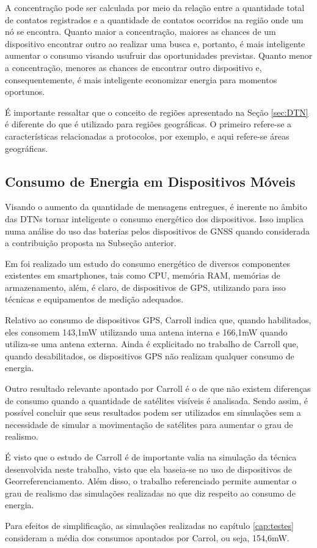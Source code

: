 A concentração pode ser calculada por meio da relação entre a quantidade total de contatos registrados e a quantidade de contatos ocorridos na região onde um nó se encontra. Quanto maior a concentração, maiores as chances de um dispositivo encontrar outro ao realizar uma busca e, portanto, é mais inteligente aumentar o consumo visando usufruir das oportunidades previstas. Quanto menor a concentração, menores as chances de encontrar outro dispositivo e, consequentemente, é mais inteligente economizar energia para momentos oportunos.

É importante ressaltar que o conceito de regiões apresentado na Seção \ref{sec:DTN} é diferente do que é utilizado para regiões geográficas. O primeiro refere-se a características relacionadas a protocolos, por exemplo, e aqui refere-se áreas geográficas.

\subsection{Consumo de Energia em Dispositivos Móveis}
\label{subsec:consumo_gps}
Visando o aumento da quantidade de mensagens entregues, é inerente no âmbito das DTNs tornar inteligente o consumo energético dos dispositivos. Isso implica numa análise do uso das baterias pelos dispositivos de GNSS quando considerada a contribuição proposta na Subseção anterior.

Em \cite{carroll2010analysis} foi realizado um estudo do consumo energético de diversos componentes existentes em smartphones, tais como CPU, memória RAM, memórias de armazenamento, além, é claro, de dispositivos de GPS, utilizando para isso técnicas e equipamentos de medição adequados.

Relativo ao consumo de dispositivos GPS, Carroll indica que, quando habilitados, eles consomem 143,1mW utilizando uma antena interna e 166,1mW quando utiliza-se uma antena externa. Ainda é explicitado no trabalho de Carroll que, quando desabilitados, os dispositivos GPS não realizam qualquer consumo de energia.

Outro resultado relevante apontado por Carroll é o de que não existem diferenças de consumo quando a quantidade de satélites visíveis é analisada. Sendo assim, é possível concluir que seus resultados podem ser utilizados em simulações sem a necessidade de simular a movimentação de satélites para aumentar o grau de realismo.

É visto que o estudo de Carroll é de importante valia na simulação da técnica desenvolvida neste trabalho, visto que ela baseia-se no uso de dispositivos de Georreferenciamento. Além disso, o trabalho referenciado permite aumentar o grau de realismo das simulações realizadas no que diz respeito ao consumo de energia. 

Para efeitos de simplificação, as simulações realizadas no capítulo \ref{cap:testes} consideram a média dos consumos apontados por Carrol, ou seja, 154,6mW.